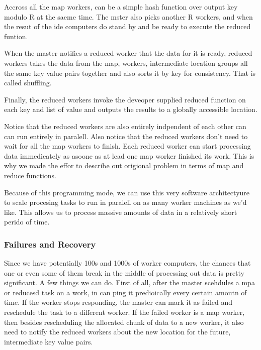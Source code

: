 \documentclass[a4paper, 11pt]{book}
\begin{document}
    Accross all the map workers, can be a simple hash function over output key modulo R at the saeme time.
    The mster also picks another R workers, and when the resut of the ide computers do stand by and be ready to execute the reduced funtion.

    When the master notifies a reduced worker that the data for it is ready, reduced workers takes the data from the map, workers, intermediate location groups all the same key value pairs together and also sorts it by key for consistency.
    That is called shuffling.

    Finally, the reduced workers invoke the deveoper supplied reduced function on each key and list of value and outputs the results to a globally accessible location.

    Notice that the reduced workers are also entirely indpendent of each other can can run entirely in paralell.
    Also notice that the reduced workers don't need to wait for all the map workers to finish.
    Each reduced worker can start processing data immedieately as asoone as at lead one map worker finished its work.
    This is why we made the effor to describe out origional problem in terms of map and reduce functions.

    Because of this programming mode, we can use this very software architectyure to scale procesing tasks to run in paralell on as many worker machines as we'd like.
    This allows us to process massive amounts of data in a relatively short perido of time.

    \subsubsection{Failures and Recovery}
    Since we have potentially 100s and 1000s of worker computers, the chances that one or even some of them break in the middle of processing out data is pretty significant.
    A few things we can do.
    First of all, after the master scehdules a mpa or reducesd task on a work, in can ping it predioically every certain amoutn of time.
    If the worker stops responding, the master can mark it as failed and reschedule the task to a different worker.
    If the failed worker is a map worker, then besides rescheduling the allocated chunk of data to a new worker, it also need to notify the reduced workers about the new location for the future, intermediate key value pairs.
\end{document}
